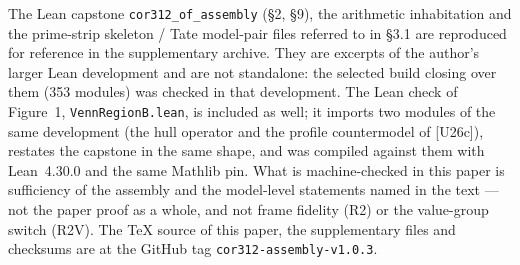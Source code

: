 \documentclass[11pt]{article}
\begin{document}
The Lean capstone \texttt{cor312\_of\_assembly} (\S2, \S9), the
arithmetic inhabitation and the prime-strip skeleton / Tate
model-pair files referred to in \S3.1 are reproduced for reference
in the supplementary archive.  They are excerpts of the author's
larger Lean development and are not standalone: the selected build
closing over them (353 modules) was checked in that development.
The Lean check of Figure~1, \texttt{VennRegionB.lean}, is included
as well; it imports two modules of the same development (the hull
operator and the profile countermodel of [U26c]), restates the
capstone in the same shape, and was compiled against them with
Lean~4.30.0 and the same Mathlib pin.
What is machine-checked in this paper is sufficiency of the
assembly and the model-level statements named in the text --- not
the paper proof as a whole, and not frame fidelity (R2) or the
value-group switch (R2V).  The TeX source of this paper, the
supplementary files and checksums are at the GitHub tag
\texttt{cor312-assembly-v1.0.3}.
\end{document}
